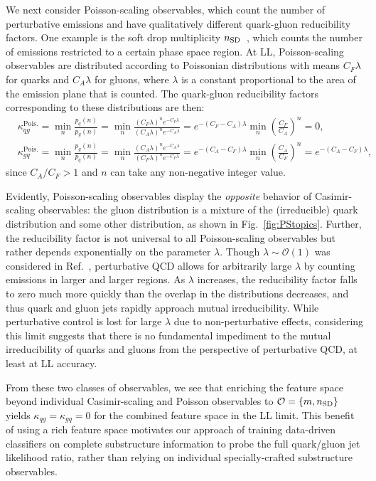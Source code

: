 \documentclass[letterpaper,11pt]{article}
\DeclareRobustCommand{\Fig}[1]{Fig.~\ref{#1}}
\DeclareRobustCommand{\Ref}[1]{Ref.~\cite{#1}}
\begin{document}
We next consider Poisson-scaling observables, which count the number of perturbative emissions and have qualitatively different quark-gluon reducibility factors.
%
One example is the soft drop multiplicity $n_{\rm SD}$~\cite{Frye:2017yrw}, which counts the number of emissions restricted to a certain phase space region.
%
At LL, Poisson-scaling observables are distributed according to Poissonian distributions with means $C_F \lambda$ for quarks and $C_A \lambda$ for gluons, where $\lambda$ is a constant proportional to the area of the emission plane that is counted.
%
The quark-gluon reducibility factors corresponding to these distributions are then:
\begin{align}\label{eq:kqgpois}
&\kappa_{qg}^\text{Pois.} = \min_n\frac{p_q(n)}{p_g(n)} = \min_n\frac{(C_F \lambda)^n e^{- C_F \lambda}}{(C_A \lambda)^n e^{- C_A \lambda}} =e^{-(C_F - C_A)\lambda}  \min_n \left(\frac{C_F}{C_A}\right)^n = 0,\\
&\kappa_{gq}^\text{Pois.} = \min_n\frac{p_g(n)}{p_q(n)} = \min_n\frac{(C_A \lambda)^n e^{- C_A \lambda}}{(C_F \lambda)^n e^{- C_F \lambda}} = e^{-(C_A-C_F) \lambda} \min_n \left(\frac{C_A}{C_F}\right)^n = e^{-(C_A-C_F)\lambda},\label{eq:kgqpois}\end{align}
since $C_A/C_F > 1$ and $n$ can take any non-negative integer value.


Evidently, Poisson-scaling observables display the {\it opposite} behavior of Casimir-scaling observables: the gluon distribution is a mixture of the (irreducible) quark distribution and some other distribution, as shown in \Fig{fig:PStopics}.
%
Further, the reducibility factor is not universal to all Poisson-scaling observables but rather depends exponentially on the parameter $\lambda$.
%
Though $\lambda\sim\mathcal O(1)$ was considered in \Ref{Frye:2017yrw}, perturbative QCD allows for arbitrarily large $\lambda$ by counting emissions in larger and larger regions.
%
As $\lambda$ increases, the reducibility factor falls to zero much more quickly than the overlap in the distributions decreases, and thus quark and gluon jets rapidly approach mutual irreducibility.
%
While perturbative control is lost for large $\lambda$ due to non-perturbative effects, considering this limit suggests that there is no fundamental impediment to the mutual irreducibility of quarks and gluons from the perspective of perturbative QCD, at least at LL accuracy.


From these two classes of observables, we see that enriching the feature space beyond individual Casimir-scaling and Poisson observables to $\mathcal O = \{m,n_{\rm SD}\}$ yields $\kappa_{qg} = \kappa_{gq} = 0$ for the combined feature space in the LL limit.
%
This benefit of using a rich feature space motivates our approach of training data-driven classifiers on complete substructure information to probe the full quark/gluon jet likelihood ratio, rather than relying on individual specially-crafted substructure observables.
\end{document}

